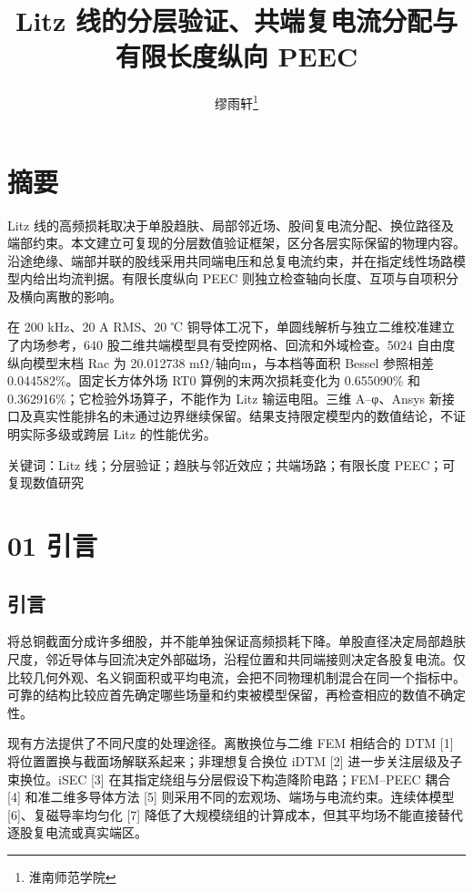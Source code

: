 \documentclass[journal,10pt]{IEEEtran}
\begin{document}
\title{Litz 线的分层验证、共端复电流分配与有限长度纵向 PEEC}
\author{缪雨轩\thanks{淮南师范学院}}

\maketitle
\FloatBarrier
\section*{摘要}
\hypertarget{abstract}{}
Litz 线的高频损耗取决于单股趋肤、局部邻近场、股间复电流分配、换位路径及端部约束。本文建立可复现的分层数值验证框架，区分各层实际保留的物理内容。沿途绝缘、端部并联的股线采用共同端电压和总复电流约束，并在指定线性场路模型内给出均流判据。有限长度纵向 PEEC 则独立检查轴向长度、互项与自项积分及横向离散的影响。

在 200 kHz、20 A RMS、20 ℃ 铜导体工况下，单圆线解析与独立二维校准建立了内场参考，640 股二维共端模型具有受控网格、回流和外域检查。5024 自由度纵向模型末档 Rac 为 20.012738 mΩ/轴向m，与本档等面积 Bessel 参照相差 0.044582\%。固定长方体外场 RT0 算例的末两次损耗变化为 0.655090\% 和 0.362916\%；它检验外场算子，不能作为 Litz 输运电阻。三维 A–φ、Ansys 新接口及真实性能排名的未通过边界继续保留。结果支持限定模型内的数值结论，不证明实际多级或跨层 Litz 的性能优劣。


关键词：Litz 线；分层验证；趋肤与邻近效应；共端场路；有限长度 PEEC；可复现数值研究


\FloatBarrier
\section*{01 引言}
\hypertarget{chapter-01}{}
\subsection*{引言}
\hypertarget{01.introduction.heading}{}
将总铜截面分成许多细股，并不能单独保证高频损耗下降。单股直径决定局部趋肤尺度，邻近导体与回流决定外部磁场，沿程位置和共同端接则决定各股复电流。仅比较几何外观、名义铜面积或平均电流，会把不同物理机制混合在同一个指标中。可靠的结构比较应首先确定哪些场量和约束被模型保留，再检查相应的数值不确定性。


现有方法提供了不同尺度的处理途径。离散换位与二维 FEM 相结合的 DTM [1] 将位置置换与截面场解联系起来；非理想复合换位 iDTM [2] 进一步关注层级及子束换位。iSEC [3] 在其指定绕组与分层假设下构造降阶电路；FEM–PEEC 耦合 [4] 和准二维多导体方法 [5] 则采用不同的宏观场、端场与电流约束。连续体模型 [6]、复磁导率均匀化 [7] 降低了大规模绕组的计算成本，但其平均场不能直接替代逐股复电流或真实端区。
\end{document}
